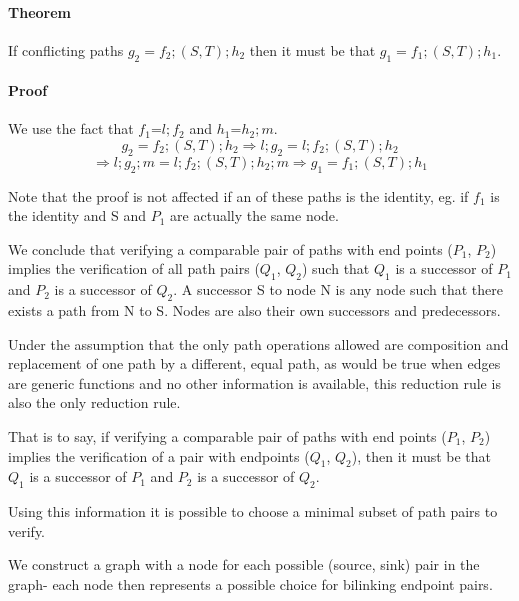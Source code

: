 \documentclass{article}
\begin{document}
\paragraph{Theorem} 
\label{reductionRule}
If conflicting paths $g_2 = f_2; (S,T); h_2$ then it must be that $g_1 = f_1; (S,T); h_1$.


\paragraph{Proof}
We use the fact that $f_1$=$l; f_2$ and $h_1$=$h_2; m$.
\[g_2 = f_2; (S,T); h_2 \Rightarrow l; g_2 = l; f_2; (S,T) ; h_2 \]
\[\Rightarrow l ; g_2 ; m = l ; f_2 ; (S,T) ; h_2 ; m \Rightarrow g_1 = f_1 ; (S,T) ; h_1\]

Note that the proof is not affected if an of these paths is the identity, eg. if $f_1$ is the identity and S and $P_1$ are actually the same node.

We conclude that verifying a comparable pair of paths with end points ($P_1$, $P_2$) implies the verification of all path pairs ($Q_1$, $Q_2$) such that $Q_1$ is a successor of $P_1$ and $P_2$ is a successor of $Q_2$. A successor S to node N is any node such that there exists a path from N to S. Nodes are also their own successors and predecessors.

Under the assumption that the only path operations allowed are composition and replacement of one path by a different, equal path, as would be true when edges are generic functions and no other information is available, this reduction rule is also the only reduction rule.

That is to say, if verifying a comparable pair of paths with end points ($P_1$, $P_2$) implies the verification of a pair with endpoints ($Q_1$, $Q_2$), then it must be that $Q_1$ is a successor of $P_1$ and $P_2$ is a successor of $Q_2$. %

Using this information it is possible to choose a minimal subset of path pairs to verify.

We construct a graph with a node for each possible (source, sink) pair in the graph- each node then represents a possible choice for bilinking endpoint pairs.
\end{document}
